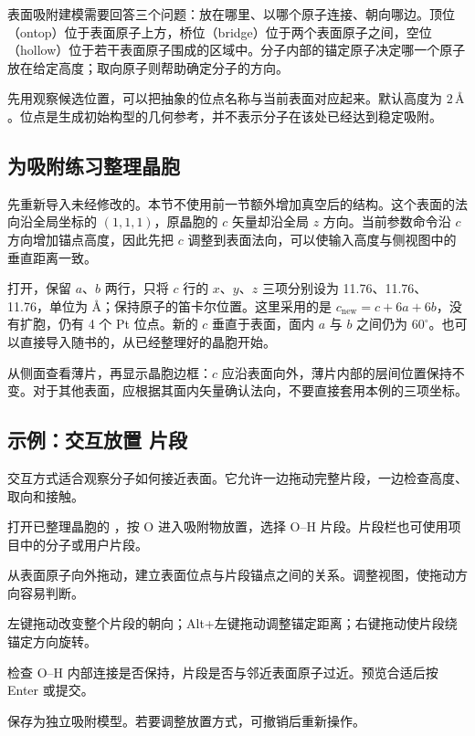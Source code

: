 表面吸附建模需要回答三个问题：放在哪里、以哪个原子连接、朝向哪边。顶位（ontop）位于表面原子上方，桥位（bridge）位于两个表面原子之间，空位（hollow）位于若干表面原子围成的区域中。分子内部的锚定原子决定哪一个原子放在给定高度；取向原子则帮助确定分子的方向。

先用观察候选位置，可以把抽象的位点名称与当前表面对应起来。默认高度为 $2\,\text{\AA}$。位点是生成初始构型的几何参考，并不表示分子在该处已经达到稳定吸附。

\subsection{为吸附练习整理晶胞}

先重新导入未经修改的。本节不使用前一节额外增加真空后的结构。这个表面的法向沿全局坐标的 $(1,1,1)$，原晶胞的 $c$ 矢量却沿全局 $z$ 方向。当前参数命令沿 $c$ 方向增加锚点高度，因此先把 $c$ 调整到表面法向，可以使输入高度与侧视图中的垂直距离一致。

打开，保留 $a$、$b$ 两行，只将 $c$ 行的 $x$、$y$、$z$ 三项分别设为 11.76、11.76、11.76，单位为 \AA；保持原子的笛卡尔位置。这里采用的是 $c_{\mathrm{new}}=c+6a+6b$，没有扩胞，仍有 4 个 Pt 位点。新的 $c$ 垂直于表面，面内 $a$ 与 $b$ 之间仍为 $60^\circ$。也可以直接导入随书的，从已经整理好的晶胞开始。

从侧面查看薄片，再显示晶胞边框：$c$ 应沿表面向外，薄片内部的层间位置保持不变。对于其他表面，应根据其面内矢量确认法向，不要直接套用本例的三项坐标。

\subsection{示例：交互放置  片段}

交互方式适合观察分子如何接近表面。它允许一边拖动完整片段，一边检查高度、取向和接触。

\begin{steps}
  \item 打开已整理晶胞的 ，按 O 进入吸附物放置，选择 O--H 片段。片段栏也可使用项目中的分子或用户片段。
  \item 从表面原子向外拖动，建立表面位点与片段锚点之间的关系。调整视图，使拖动方向容易判断。
  \item 左键拖动改变整个片段的朝向；Alt+左键拖动调整锚定距离；右键拖动使片段绕锚定方向旋转。
  \item 检查 O--H 内部连接是否保持，片段是否与邻近表面原子过近。预览合适后按 Enter 或提交。
  \item 保存为独立吸附模型。若要调整放置方式，可撤销后重新操作。
\end{steps}

